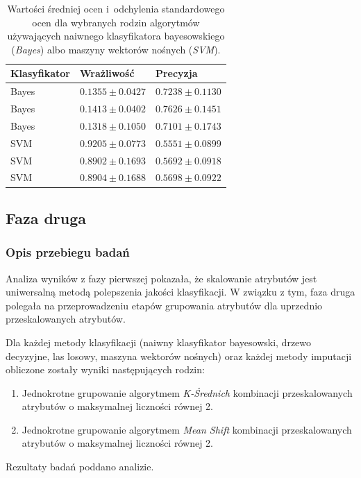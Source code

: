\documentclass[../thesis.tex]{subfiles}
\begin{document}
\begin{table}[h]
\begin{center}
\begin{tabular}{ | l | l | l | }
\hline
\rowcolor{lightgray} Klasyfikator & Wrażliwość & Precyzja \\\hline

Bayes & $0.1355 \pm 0.0427$ & $0.7238 \pm 0.1130$\\\hline
Bayes & $0.1413 \pm 0.0402$ & $0.7626 \pm 0.1451$\\\hline
Bayes & $0.1318 \pm 0.1050$ & $0.7101 \pm 0.1743$\\\hline
SVM & $0.9205 \pm 0.0773$ & $0.5551 \pm 0.0899$\\\hline
SVM & $0.8902 \pm 0.1693$ & $0.5692 \pm 0.0918$\\\hline
SVM & $0.8904 \pm 0.1688$ & $0.5698 \pm 0.0922$\\\hline

\end{tabular}
\caption{Wartości średniej ocen i~odchylenia standardowego ocen dla wybranych rodzin algorytmów używających naiwnego klasyfikatora bayesowskiego (\emph{Bayes}) albo maszyny wektorów nośnych (\emph{SVM}).}
\label{results:table_svm_bayes}
\end{center}
\end{table}

\subsection{Faza druga}

\subsubsection{Opis przebiegu badań}

Analiza wyników z fazy pierwszej pokazała, że skalowanie atrybutów jest uniwersalną metodą polepszenia jakości klasyfikacji. W związku z tym, faza druga polegała na przeprowadzeniu etapów grupowania atrybutów dla uprzednio przeskalowanych atrybutów.

Dla każdej metody klasyfikacji (naiwny klasyfikator bayesowski, drzewo decyzyjne, las losowy, maszyna wektorów nośnych) oraz każdej metody imputacji obliczone zostały wyniki następujących rodzin:
\begin{enumerate}
  \item Jednokrotne grupowanie algorytmem \emph{K-Średnich} kombinacji przeskalowanych atrybutów o maksymalnej liczności równej 2.
  \item Jednokrotne grupowanie algorytmem \emph{Mean Shift} kombinacji przeskalowanych atrybutów o maksymalnej liczności równej 2.
\end{enumerate}
Rezultaty badań poddano analizie.
\end{document}
